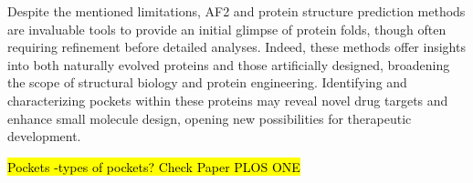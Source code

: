 Despite the mentioned limitations, AF2 and protein structure prediction methods are invaluable tools to provide an initial glimpse of protein folds, though often requiring refinement before detailed analyses\cite{zhang_benchmarking_2023, holcomb_evaluation_2023, scardino_how_2023}. Indeed, these methods offer insights into both naturally evolved proteins and those artificially designed, broadening the scope of structural biology and protein engineering. Identifying and characterizing pockets within these proteins may reveal novel drug targets and enhance small molecule design, opening new possibilities for therapeutic development.

\hl{Pockets -types of pockets? Check Paper PLOS ONE }